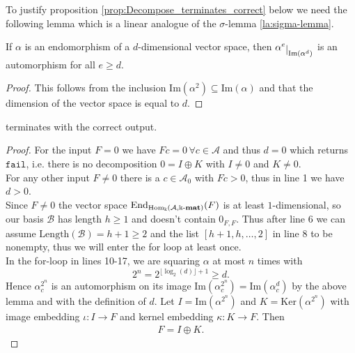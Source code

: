 To justify proposition \ref{prop:Decompose_terminates_correct} below we need the following lemma which is a linear analogue of the $\sigma$-lemma
\ref{la:sigma-lemma}.

\begin{lemma}
If $\alpha$ is an endomorphism of a $d$-dimensional vector space, then $\alpha^{e}\restrict{\mathrm{Im}(\alpha^{d})}$ is an automorphism for
all $e \geq d$.
\end{lemma}
\begin{proof}
This follows from the inclusion $\mathrm{Im}(\alpha^{2}) \subseteq \mathrm{Im}(\alpha)$ and that the dimension of the vector space is equal to
$d$.
\end{proof}

\begin{proposition}\label{prop:Decompose_terminates_correct}
 terminates with the correct output.
\end{proposition}
\begin{proof}
For the input $F = 0$ we have $Fc = 0\,\forall c \in \mathcal{A}$ and thus $d = 0$ which returns $\mathtt{fail}$, i.e. there is no
decomposition $0 = I \oplus K$ with $I \neq 0$ and $K \neq 0$.\\

\noindent For any other input $F \neq 0$ there is a $c \in \mathcal{A}_{0}$ with $Fc > 0$, thus in line 1 we have $d > 0$.\\
Since $F \neq 0$ the vector space $\mathrm{End}_{\mathrm{Hom_{\Bbbk}}(\mathcal{A},\Bbbk\textnormal{-}\mathbf{mat})}(F)$ is at least $1$-dimensional, so our basis $\mathcal{B}$ has
length $h \geq 1$ and doesn't contain $0_{F,F}$. Thus after line 6 we can assume $\mathrm{Length}(\mathcal{B}) = h+1 \geq 2$ and
the list $[h+1,h,\dots,2]$ in line 8 to be nonempty, thus we will enter the for loop at least once.\\

\noindent In the for-loop in lines 10-17, we are squaring $\alpha$ at most $n$ times with
\[
2^{n} = 2^{\lfloor\log_{2}(d)\rfloor+1} \geq d.
\]
Hence $\alpha_{c}^{2^{n}}$ is an automorphism on its image $\mathrm{Im}(\alpha_{c}^{2^{n}}) = \mathrm{Im}(\alpha_{c}^{d})$
by the above lemma and with the definition of $d$. Let $I = \mathrm{Im}(\alpha^{2^{n}})$ and $K = \mathrm{Ker}(\alpha^{2^{n}})$
with image embedding $\iota : I \rightarrow F$ and kernel embedding $\kappa : K \rightarrow F$. Then 
\begin{align}
F = I \oplus K.
\end{align}
\end{proof}

